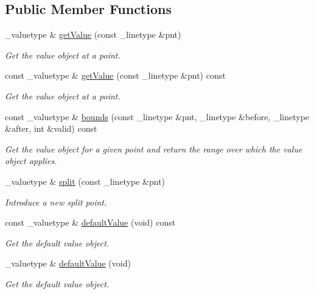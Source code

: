 \subsection*{Public Member Functions}
\begin{DoxyCompactItemize}
\item 
\+\_\+valuetype \& \mbox{\hyperlink{classpartmap_af5e8ac68250b9e90bef2481df65bdeb3}{get\+Value}} (const \+\_\+linetype \&pnt)
\begin{DoxyCompactList}\small\item\em Get the value object at a point. \end{DoxyCompactList}\item 
const \+\_\+valuetype \& \mbox{\hyperlink{classpartmap_a2bb428c33ce4c264eafe568c17e9096c}{get\+Value}} (const \+\_\+linetype \&pnt) const
\begin{DoxyCompactList}\small\item\em Get the value object at a point. \end{DoxyCompactList}\item 
const \+\_\+valuetype \& \mbox{\hyperlink{classpartmap_ac0e5535fb352dd1bd1d85971cdac1d9f}{bounds}} (const \+\_\+linetype \&pnt, \+\_\+linetype \&before, \+\_\+linetype \&after, int \&valid) const
\begin{DoxyCompactList}\small\item\em Get the value object for a given point and return the range over which the value object applies. \end{DoxyCompactList}\item 
\+\_\+valuetype \& \mbox{\hyperlink{classpartmap_addca2efbfee018ee367de754e7772305}{split}} (const \+\_\+linetype \&pnt)
\begin{DoxyCompactList}\small\item\em Introduce a new split point. \end{DoxyCompactList}\item 
const \+\_\+valuetype \& \mbox{\hyperlink{classpartmap_a54e9c1e59dda87a818b92c8c32819b91}{default\+Value}} (void) const
\begin{DoxyCompactList}\small\item\em Get the default value object. \end{DoxyCompactList}\item 
\+\_\+valuetype \& \mbox{\hyperlink{classpartmap_a8d90ac149dc375cb14c5126a64b240b8}{default\+Value}} (void)
\begin{DoxyCompactList}\small\item\em Get the default value object. \end{DoxyCompactList}\item 

\end{DoxyCompactItemize}

